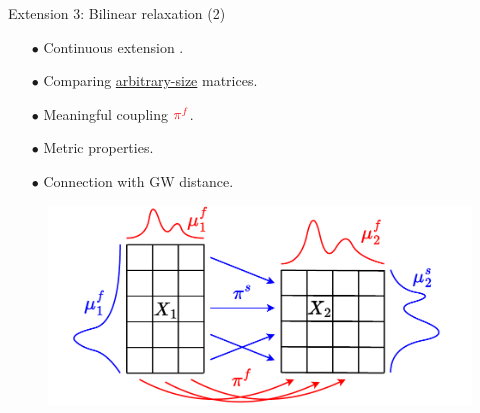 \documentclass{beamer}
\newcommand{\pif}{{\color{red}{\pi^f}}}
\begin{document}
\begin{frame}{Extension 3: Bilinear relaxation (2)}
\vspace{-0.3cm}
\begin{minipage}[t]{0.6\linewidth}
  \begin{itemize}
    \item[$\bullet$] Continuous extension \parencite{Chowdhury21b}.
    \item[$\bullet$] Comparing \underline{arbitrary-size} matrices.
    \item[$\bullet$] Meaningful {\color{red}{feature}} coupling $\pif$.
    \item[$\bullet$] Metric properties.
    \item[$\bullet$] Connection with GW distance.
  \end{itemize}
  \end{minipage}%
  \hfill%
  \hspace{-6cm}
  \begin{minipage}[t]{0.55\linewidth}
    \vspace{0.2cm}
  \begin{figure}
    \centering
    \includegraphics[width=1.15\linewidth, keepaspectratio=true]{OT_new/coot_matrix_ot.pdf}
  \end{figure}
\end{minipage}

\end{frame}
\end{document}
